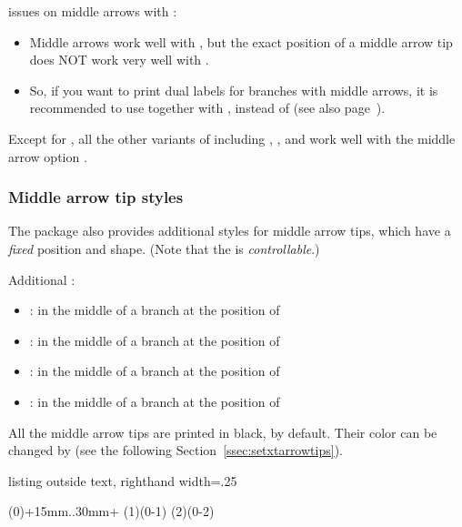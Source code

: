 \remark issues on middle arrows with \cmd{\istB}:
\begin{itemize}\tightlist
\item Middle arrows work well with \cmd{\istb}, but the exact position of a middle arrow tip does NOT work very well with \cmd{\istB}.
\item So, if you want to print dual labels for branches with middle arrows, it is recommended to use \cmd{\istb} together with \cmd{\xtActionLabel}, instead of \cmd{\istB} (see also page~\pageref{page:noistB}).
\end{itemize}

Except for \cmd{\istB}, all the other variants of \cmd{\istb} including \cmd{\istbA}, \cmd{\cntmistb}, and \cmd{\cntmAistb} work well with the middle arrow option \xw{->-}.


\subsubsection{Middle arrow tip styles}


The package also provides additional styles for middle arrow tips, which have a \emph{fixed} position and shape. 
(Note that the  \xw{->-} is \emph{controllable}.)


  Additional :
\begin{itemize}\tightlist
\item \ixttw{->>-} :  in the middle of a branch at the position of 
\item \ixttw{->>>-} :  in the middle of a branch at the position of 
\item {} :  in the middle of a branch at the position of 
\item {} :  in the middle of a branch at the position of 
\end{itemize}

\remark
All the middle arrow tips are printed in black, by default.
Their color can be changed by \cmd{\setxtarrowtips} (see the following Section~\ref{ssec:setxtarrowtips}).

\begin{tcblisting}{listing outside text, righthand width=.25\linewidth}
\begin{istgame}[xscale=.8]
\istroot(0)+15mm..30mm+
  \istb[->>-]    \istb[->>>-,red] \endist
\istroot(1)(0-1)
  \istb[-o-,red] \istb[-x-,blue]  \endist
{}
\istroot(2)(0-2)
  \istb[-o-]     \istb[-x-]       \endist
\end{istgame}
\end{tcblisting}


